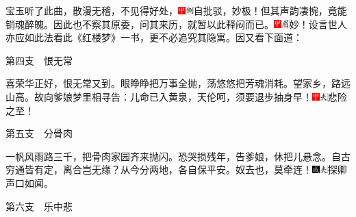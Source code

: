 宝玉听了此曲，散漫无稽，不见得好处，{\includegraphics[width=3mm]{../Images/00002}\includegraphics[width=3mm]{../Images/00011}\footnotesize \kaishu 自批驳，妙极！}但其声韵凄惋，竟能销魂醉魄。因此也不察其原委，问其来历，就暂以此释闷而已。{\includegraphics[width=3mm]{../Images/00002}\includegraphics[width=3mm]{../Images/00010}\footnotesize \kaishu 妙！设言世人亦应如此法看此《红楼梦》一书，更不必追究其隐寓。}因又看下面道：

第四支　恨无常

喜荣华正好，恨无常又到。眼睁睁把万事全抛，荡悠悠把芳魂消耗。望家乡，路远山高。故向爹娘梦里相寻告：儿命已入黄泉，天伦呵，须要退步抽身早！{\includegraphics[width=3mm]{../Images/00002}\includegraphics[width=3mm]{../Images/00012}\footnotesize \kaishu 悲险之至！}

第五支　分骨肉

一帆风雨路三千，把骨肉家园齐来抛闪。恐哭损残年，告爹娘，休把儿悬念。自古穷通皆有定，离合岂无缘？从今分两地，各自保平安。奴去也，莫牵连！{\includegraphics[width=3mm]{../Images/00005}\includegraphics[width=3mm]{../Images/00012}\footnotesize \kaishu 探卿声口如闻。}

第六支　乐中悲

